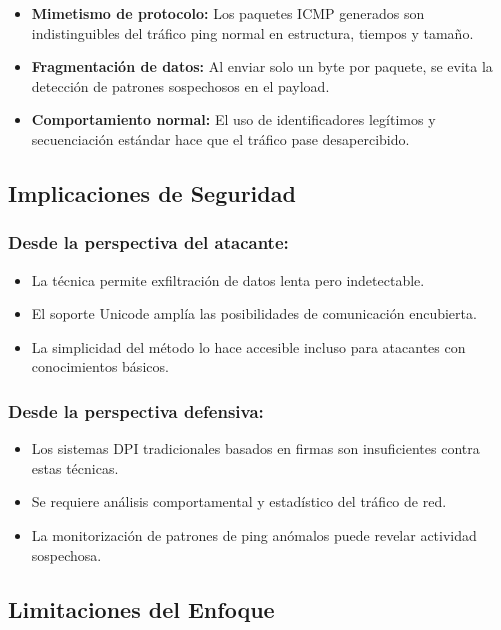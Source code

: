 \documentclass[letter,12pt]{article}
\begin{document}
\begin{itemize}
    \item \textbf{Mimetismo de protocolo:} Los paquetes ICMP generados son indistinguibles del tráfico ping normal en estructura, tiempos y tamaño.
    \item \textbf{Fragmentación de datos:} Al enviar solo un byte por paquete, se evita la detección de patrones sospechosos en el payload.
    \item \textbf{Comportamiento normal:} El uso de identificadores legítimos y secuenciación estándar hace que el tráfico pase desapercibido.
\end{itemize}

\subsection*{Implicaciones de Seguridad}

\subsubsection*{Desde la perspectiva del atacante:}
\begin{itemize}
    \item La técnica permite exfiltración de datos lenta pero indetectable.
    \item El soporte Unicode amplía las posibilidades de comunicación encubierta.
    \item La simplicidad del método lo hace accesible incluso para atacantes con conocimientos básicos.
\end{itemize}

\subsubsection*{Desde la perspectiva defensiva:}
\begin{itemize}
    \item Los sistemas DPI tradicionales basados en firmas son insuficientes contra estas técnicas.
    \item Se requiere análisis comportamental y estadístico del tráfico de red.
    \item La monitorización de patrones de ping anómalos puede revelar actividad sospechosa.
\end{itemize}

\subsection*{Limitaciones del Enfoque}
\end{document}
